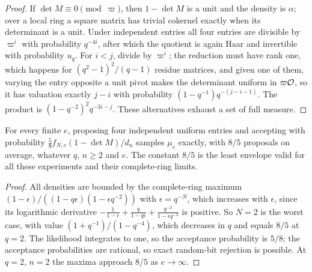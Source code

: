 \begin{proof}
If $\det M\equiv0\pmod\varpi$, then $1-\det M$ is a unit and the density is $\alpha$; over a local
ring a square matrix has trivial cokernel exactly when its determinant is a unit. Under
independent entries all four entries are divisible by $\varpi^i$ with probability $q^{-4i}$, after
which the quotient is again Haar and invertible with probability $u_q$. For $i<j$, divide by
$\varpi^i$; the reduction must have rank one, which happens for $(q^2-1)^2/(q-1)$ residue matrices,
and given one of them, varying the entry opposite a unit pivot makes the determinant uniform in
$\varpi\mathcal{O}$, so it has valuation exactly $j-i$ with probability $(1-q^{-1})q^{-(j-i-1)}$. The
product is $(1-q^{-2})^2q^{-3i-j}$. These alternatives exhaust a set of full measure.
\end{proof}

\begin{corollary}\label{spn:cor:padic-sampler}
For every finite $e$, proposing four independent uniform entries and accepting with probability
$\frac58f_{N,e}(1-\det M)/d_n$ samples $\mu_e$ exactly, with $8/5$ proposals on average, whatever
$q$, $n\ge2$ and $e$. The constant $8/5$ is the least envelope valid for all these experiments and
their complete-ring limits.
\end{corollary}

\begin{proof}
All densities are bounded by the complete-ring maximum $(1-\epsilon)/((1-q\epsilon)(1-\epsilon
q^{-2}))$ with $\epsilon=q^{-N}$, which increases with $\epsilon$, since its logarithmic derivative
$-\frac1{1-\epsilon}+\frac q{1-q\epsilon}+\frac{q^{-2}}{1-\epsilon q^{-2}}$ is positive. So $N=2$
is the worst case, with value $(1+q^{-1})/(1-q^{-4})$, which decreases in $q$ and equals $8/5$ at
$q=2$. The likelihood integrates to one, so the acceptance probability is $5/8$; the acceptance
probabilities are rational, so exact random-bit rejection is possible. At $q=2$, $n=2$ the maxima
approach $8/5$ as $e\to\infty$.
\end{proof}

